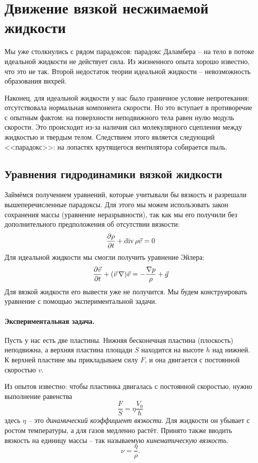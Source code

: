 \newpage
\section{Движение вязкой несжимаемой жидкости}

Мы уже столкнулись с рядом парадоксов: парадокс Даламбера -- на тело в потоке идеальной жидкости не действует сила. Из жизненного опыта хорошо известно, что это не так. Второй недостаток теории идеальной жидкости -- невозможность образования вихрей. 

Наконец, для идеальной жидкости у нас было граничное условие непротекания: отсутствовала нормальная компонента скорости. Но это вступает в противоречие с опытным фактом: на поверхности неподвижного тела равен нулю модуль скорости. Это происходит из-за наличия сил молекулярного сцепления между жидкостью и твердым телом. Следствием этого является следующий <<парадокс>>: на лопастях крутящегося вентилятора собирается пыль. 

\subsection{Уравнения гидродинамики вязкой жидкости}

Займёмся получением уравнений, которые учитывали бы вязкость и разрешали вышеперечисленные парадоксы. Для этого мы можем использовать закон сохранения массы (уравнение неразрывности), так как мы его получили без дополнительного предположения об отсутствии вязкости:
\begin{equation}
    \pdv{\rho}{t}+\operatorname{div} \rho \vec{v} = 0
\end{equation}
Для идеальной жидкости мы смогли получить уравнение Эйлера:
\begin{equation}
    \pdv{\vec{v}}{t}+(\vec{v}\,\nabla)\vec{v} = -\frac{\nabla p}{\rho}+\vec{g}
\end{equation}
Для вязкой жидкости его вывести уже не получится. Мы будем конструировать уравнение с помощью экспериментальной задачи.

\paragraph{Экспериментальная задача.} Пусть у нас есть две пластины. Нижняя бесконечная пластина (плоскость) неподвижна, а верхняя пластина площади $S$ находится на высоте $h$ над нижней. К верхней пластине мы прикладываем силу $F$, и она двигается с постоянной скоростью $v$.

Из опытов известно: чтобы пластинка двигалась с постоянной скоростью, нужно выполнение равенства
\begin{equation}
    \frac{F}{S} = \eta \frac{V_0}{h}
\end{equation}
здесь $\eta$ -- это \textit{динамический коэффициент вязкости}. Для жидкости он убывает с ростом температуры, а для газов медленно растёт.
Принято также вводить вязкость на единицу массы -- так называемую \textit{кинематическую вязкость}.
\begin{equation}
    \nu = \frac{\eta}{\rho}.
\end{equation}

